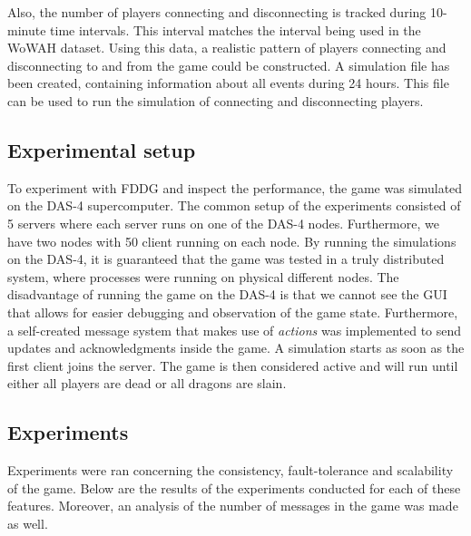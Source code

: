 Also, the number of players connecting and disconnecting is tracked during 10-minute time intervals.
This interval matches the interval being used in the WoWAH dataset.
Using this data, a realistic pattern of players connecting and disconnecting to and from the game could be constructed.
A simulation file has been created, containing information about all events during 24 hours. This file can be used to run the simulation of connecting and disconnecting players.

\subsection{Experimental setup}
\label{subsec:experimental_setup}

To experiment with FDDG and inspect the performance, the game was simulated on the DAS-4 supercomputer.
The common setup of the experiments consisted of 5 servers where each server runs on one of the DAS-4 nodes. Furthermore, we have two nodes with 50 client running on each node.
By running the simulations on the DAS-4, it is guaranteed that the game was tested in a truly distributed system, where processes were running on physical different nodes.
The disadvantage of running the game on the DAS-4 is that we cannot see the GUI that allows for easier debugging and observation of the game state.
Furthermore, a self-created message system that makes use of \emph{actions} was implemented to send updates and acknowledgments inside the game.
A simulation starts as soon as the first client joins the server. The game is then considered active and will run until either all players are dead or all dragons are slain.


\subsection{Experiments}
\label{subsec:experiments}
	Experiments were ran concerning the consistency, fault-tolerance and scalability of the game. Below are the results of the experiments conducted for each of these features. Moreover, an analysis of the number of messages in the game was made as well.

